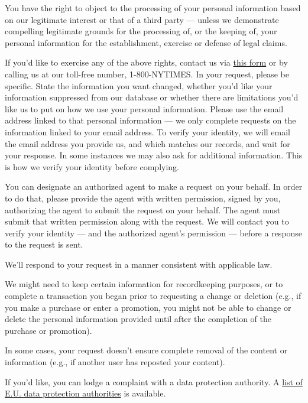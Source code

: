 You have the right to object to the processing of your personal
information based on our legitimate interest or that of a third party
--- unless we demonstrate compelling legitimate grounds for the
processing of, or the keeping of, your personal information for the
establishment, exercise or defense of legal claims.

If you'd like to exercise any of the above rights, contact us via
\href{https://www.nytimes.com/data-subject-request}{this form} or by
calling us at our toll-free number, 1-800-NYTIMES. In your request,
please be specific. State the information you want changed, whether
you'd like your information suppressed from our database or whether
there are limitations you'd like us to put on how we use your personal
information. Please use the email address linked to that personal
information --- we only complete requests on the information linked to
your email address. To verify your identity, we will email the email
address you provide us, and which matches our records, and wait for your
response. In some instances we may also ask for additional information.
This is how we verify your identity before complying.

You can designate an authorized agent to make a request on your behalf.
In order to do that, please provide the agent with written permission,
signed by you, authorizing the agent to submit the request on your
behalf. The agent must submit that written permission along with the
request. We will contact you to verify your identity --- and the
authorized agent's permission --- before a response to the request is
sent.

We'll respond to your request in a manner consistent with applicable
law.

We might need to keep certain information for recordkeeping purposes, or
to complete a transaction you began prior to requesting a change or
deletion (e.g., if you make a purchase or enter a promotion, you might
not be able to change or delete the personal information provided until
after the completion of the purchase or promotion).

In some cases, your request doesn't ensure complete removal of the
content or information (e.g., if another user has reposted your
content).

If you'd like, you can lodge a complaint with a data protection
authority. A
\href{https://ec.europa.eu/newsroom/article29/item-detail.cfm?item_id=612080}{list
of E.U. data protection authorities} is available.


